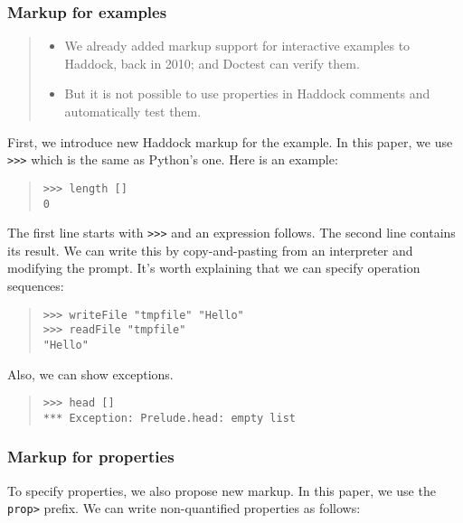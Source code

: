 \documentclass[preprint]{sigplanconf}
\begin{document}
\subsubsection{Markup for examples}

\begin{quote}\begin{itemize}
    \item
        We already added markup support for interactive examples to
        Haddock, back in 2010; and Doctest can verify them.
    \item
        But it is not possible to use properties in Haddock comments
        and automatically test them.
\end{itemize} \end{quote}

\noindent First, we introduce new Haddock markup for the example.
In this paper, we use {\tt >>>} which is the same as Python's one.
Here is an example:

\begin{quote}
\small
\begin{verbatim}
>>> length []
0
\end{verbatim}
\end{quote}

\noindent The first line starts with {\tt >>>} and an expression follows. The second line contains its result. We can write this by copy-and-pasting from an interpreter and modifying the prompt.
It's worth explaining that we can specify operation sequences:

\begin{quote}
\small
\begin{verbatim}
>>> writeFile "tmpfile" "Hello"
>>> readFile "tmpfile"
"Hello"
\end{verbatim}
\end{quote}

\noindent Also, we can show exceptions.

\begin{quote}
\small
\begin{verbatim}
>>> head []
*** Exception: Prelude.head: empty list
\end{verbatim}
\end{quote}

\subsubsection{Markup for properties}

\noindent To specify properties, we also propose new markup. In this paper, we
use the {\tt prop>} prefix. We can write non-quantified properties as follows:
\end{document}
